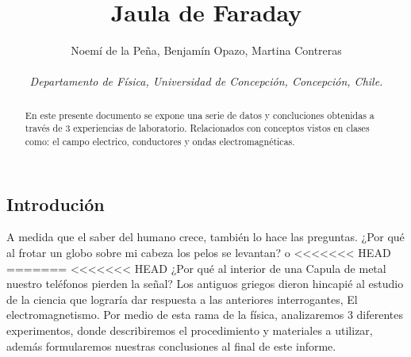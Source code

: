 \documentclass[a4paper, 12p]{article}
\title{Jaula de Faraday}
\author{Noemí de la Peña, Benjamín Opazo, Martina Contreras \\ \\
 \textit{ Departamento de Física, Universidad de Concepción, Concepción, Chile. }}
\date{}
\begin{document}
\maketitle 



    


\begin{abstract}
En este presente documento se expone una serie de datos y concluciones 
obtenidas a través de 3 experiencias de laboratorio. Relacionados con conceptos vistos en clases como: el campo electrico,
conductores y ondas electromagnéticas.
\end{abstract}

\begin{multicols*}{2}

\section*{Introdución}
A medida que el saber del humano crece, también lo hace las preguntas.
¿Por qué al frotar un globo sobre mi cabeza los pelos se levantan? o 
<<<<<<< HEAD
=======
<<<<<<< HEAD
¿Por qué al interior de una Capula de metal nuestro teléfonos pierden la señal?
Los antiguos griegos dieron hincapié al estudio de la ciencia que 
lograría dar respuesta a las anteriores interrogantes, El electromagnetismo.
Por medio de esta rama de la física, analizaremos 3 diferentes experimentos, donde describiremos el procedimiento y materiales a utilizar, además   formularemos nuestras conclusiones al final de este informe.


\end{multicols*}
\end{document}
